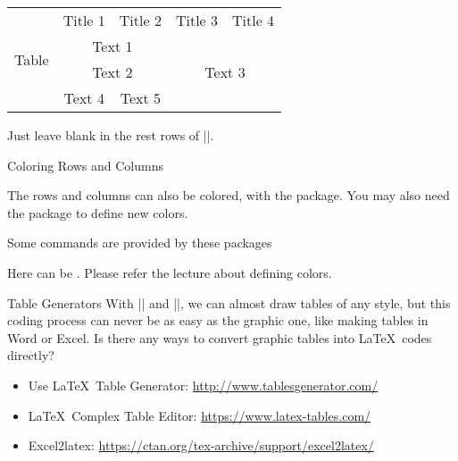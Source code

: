 \begin{frame}[fragile]

\begin{latexexample}
\centering
\begin{tabular}{|c|c|c|c|c|}
  \hline
  \multirow{4}{*}{Table} & Title 1 & Title 2 & Title 3 & Title 4 \\
  \cline{2-5}
  & \multicolumn{2}{c|}{Text 1} & 
  \multicolumn{2}{c|}{\multirow{3}{*}{Text 3}} \\
  \cline{2-3}
  & \multicolumn{2}{c|}{Text 2} & \multicolumn{2}{c|}{} \\
  \cline{2-3}
  & Text 4 & Text 5 & \multicolumn{2}{c|}{} \\
  \hline
\end{tabular}
\end{latexexample}

Just leave blank in the rest rows of \LC|\multirow|.

\end{frame}

\begin{frame}[fragile]{Coloring Rows and Columns}

The rows and columns can also be colored, with the  package. You may also need the  package to define new colors.
\begin{command}
\begin{LCL}
\usepackage{xcolor}
\usepackage{colortbl}
\end{LCL}
\end{command}

Some commands are provided by these packages
\begin{command}
\begin{LCL}
\end{LCL}
\end{command}

Here  can be . Please refer the lecture about defining colors.

\end{frame}


\begin{frame}[fragile]{Table Generators}
	With \LC|\multirow| and \LC|\multicolumn|, we can almost draw tables of any style, but this coding process can never be as easy as the graphic one, like making tables in Word or Excel. Is there any ways to convert graphic tables into \LaTeX\ codes directly?\\
	\begin{itemize}
		\item Use \LaTeX\ Table Generator: \url{http://www.tablesgenerator.com/}
		\item \LaTeX\ Complex Table Editor: \url{https://www.latex-tables.com/}
		\item Excel2latex: \url{https://ctan.org/tex-archive/support/excel2latex/}
	\end{itemize}
\end{frame}

